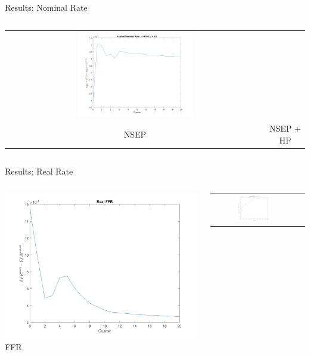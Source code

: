 \documentclass{beamer}
\begin{document}
\begin{frame}{Results: Nominal Rate}
\begin{columns}
\begin{tabular}{cc}
  \includegraphics[width=0.45\textwidth]{figs/irf/nominal_implied_4.png} \\
  NSEP & NSEP + HP
\end{tabular}
\end{columns}
\end{frame}

\begin{frame}{Results: Real Rate}
\begin{columns}
  \centering
  \includegraphics[width=\textwidth]{figs/irf/real_ffr.png} \\
  FFR
  \begin{tabular}{cc}
  \includegraphics[width=0.45\textwidth]{figs/irf/real_implied_1.png} &

\end{tabular}
\end{columns}
\end{frame}
\end{document}
